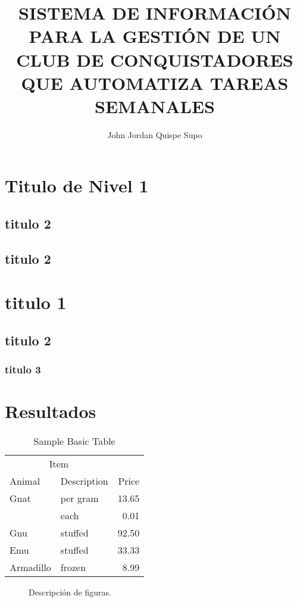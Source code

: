 \documentclass[man, floatsintext]{apa7}
\title{SISTEMA DE INFORMACIÓN PARA LA GESTIÓN DE UN CLUB DE CONQUISTADORES QUE AUTOMATIZA TAREAS SEMANALES}
\author{John Jordan Quispe Supo}
\affiliation{Instituto de Educación Superior Privado del Sur}
\begin{document}
    \maketitle
    \section{Titulo de Nivel 1}
    \subsection{titulo 2}
    \subsection{titulo 2}
    \section{titulo 1}
    \subsection{titulo 2}
    \subsubsection{titulo 3}
    \section{Resultados}
    \begin{table}[h]
        \caption{Sample Basic Table}
        \label{tab:BasicTable}
        \begin{tabular}{@{}llr@{}}         \toprule
        \multicolumn{2}{c}{Item}        \\ \cmidrule(r){1-2}
        Animal    & Description & Price \\ \midrule
        Gnat      & per gram    & 13.65 \\
        & each        &  0.01 \\
        Gnu       & stuffed     & 92.50 \\
        Emu       & stuffed     & 33.33 \\
        Armadillo & frozen      &  8.99 \\ \bottomrule
        \end{tabular}
    \end{table}
    \begin{figure}
        \caption{Descripción de figuras.}
        \label{fig:Figure1}
    \end{figure}
\end{document}
